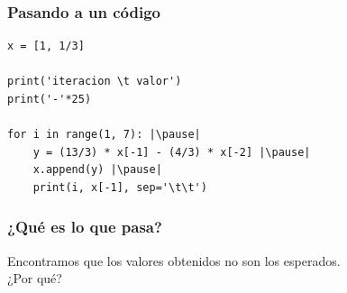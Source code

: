 \documentclass[12pt]{beamer}
\begin{document}
\begin{frame}[fragile]
\frametitle{Pasando a un código}
\begin{lstlisting}[caption=Implementando el código de la sucesión]
x = [1, 1/3]

print('iteracion \t valor')
print('-'*25)

for i in range(1, 7): |\pause|
	y = (13/3) * x[-1] - (4/3) * x[-2] |\pause|
	x.append(y) |\pause|
	print(i, x[-1], sep='\t\t') 
\end{lstlisting}
\end{frame}
\begin{frame}
\frametitle{¿Qué es lo que pasa?}
Encontramos que los valores obtenidos no son los esperados.
\\
\bigskip
\pause
¿Por qué?
\end{frame}
\end{document}
